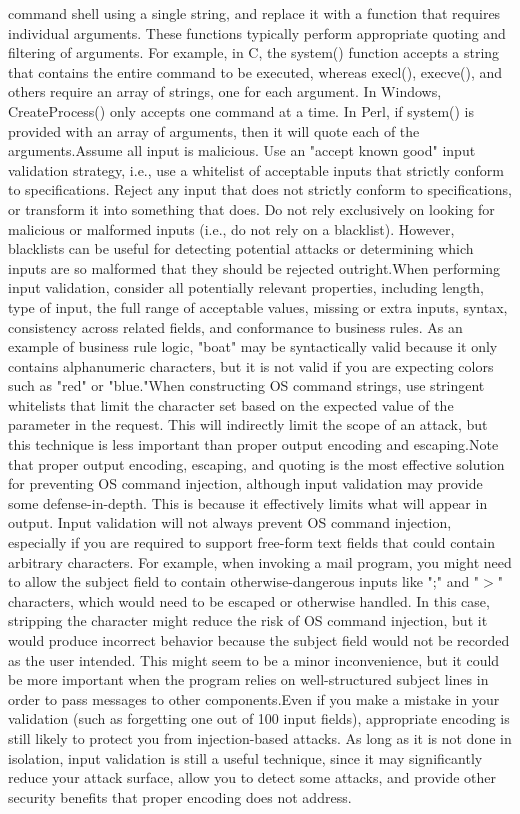 \documentclass[10pt]{article}
\begin{document}
\begin{itemize}
command shell using a single string, and replace it with a function that requires individual arguments. These functions typically perform appropriate quoting and filtering of arguments. For example, in C, the system() function accepts a string that contains the entire command to be executed, whereas execl(), execve(), and others require an array of strings, one for each argument. In Windows, CreateProcess() only accepts one command at a time. In Perl, if system() is provided with an array of arguments, then it will quote each of the arguments.Assume all input is malicious. Use an "accept known good" input validation strategy, i.e., use a whitelist of acceptable inputs that strictly conform to specifications. Reject any input that does not strictly conform to specifications, or transform it into something that does. Do not rely exclusively on looking for malicious or malformed inputs (i.e., do not rely on a blacklist). However, blacklists can be useful for detecting potential attacks or determining which inputs are so malformed that they should be rejected outright.When performing input validation, consider all potentially relevant properties, including length, type of input, the full range of acceptable values, missing or extra inputs, syntax, consistency across related fields, and conformance to business rules. As an example of business rule logic, "boat" may be syntactically valid because it only contains alphanumeric characters, but it is not valid if you are expecting colors such as "red" or "blue."When constructing OS command strings, use stringent whitelists that limit the character set based on the expected value of the parameter in the request. This will indirectly limit the scope of an attack, but this technique is less important than proper output encoding and escaping.Note that proper output encoding, escaping, and quoting is the most effective solution for preventing OS command injection, although input validation may provide some defense-in-depth. This is because it effectively limits what will appear in output. Input validation will not always prevent OS command injection, especially if you are required to support free-form text fields that could contain arbitrary characters. For example, when invoking a mail program, you might need to allow the subject field to contain otherwise-dangerous inputs like ";" and "$>$" characters, which would need to be escaped or otherwise handled. In this case, stripping the character might reduce the risk of OS command injection, but it would produce incorrect behavior because the subject field would not be recorded as the user intended. This might seem to be a minor inconvenience, but it could be more important when the program relies on well-structured subject lines in order to pass messages to other components.Even if you make a mistake in your validation (such as forgetting one out of 100 input fields), appropriate encoding is still likely to protect you from injection-based attacks. As long as it is not done in isolation, input validation is still a useful technique, since it may significantly reduce your attack surface, allow you to detect some attacks, and provide other security benefits that proper encoding does not address.

\end{itemize}
\end{document}
